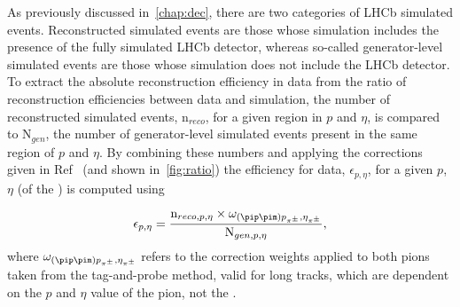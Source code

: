 


As previously discussed in~\autoref{chap:dec}, there are two categories of LHCb simulated events. Reconstructed simulated events are those whose simulation includes the presence of the fully simulated LHCb detector, whereas so-called generator-level simulated events are those whose simulation does not include the LHCb detector. %
To extract the absolute reconstruction efficiency in data from the ratio of reconstruction efficiencies between data and simulation, the number of reconstructed simulated events, $\textrm{n}_{reco}$,  for a given region in $p$ and $\eta$, is compared to $\textrm{N}_{gen}$, the number of generator-level simulated events present in the same region of $p$ and $\eta$. By combining these numbers and applying the corrections given in Ref~\cite{LHCB-DP-2013-002} (and shown in~\autoref{fig:ratio}) the efficiency for data, $\epsilon_{p,\eta}$, for a given $p$, $\eta$ (of the \KS) is computed using

\begin{equation}
  \epsilon_{p,\eta} = \frac{\textrm{n}_{reco, p, \eta}\times \omega_{(\pip\pim)p_{\pi^{\pm}},\eta_{\pi^{\pm}}}}{\textrm{N}_{gen, p, \eta}},
  \label{eq:dataeff} 
\end{equation}
where $\omega_{(\pip\pim)p_{\pi^{\pm}},\eta_{\pi^{\pm}}}$ refers to the correction weights applied to both pions taken from the \jpsi tag-and-probe method, valid for long tracks, which are dependent on the $p$ and $\eta$ value of the pion, not the \KS. 

